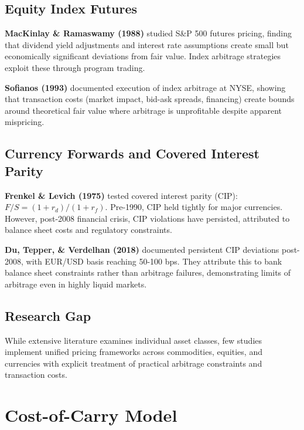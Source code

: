 \documentclass[12pt,a4paper]{article}
\begin{document}
\subsection{Equity Index Futures}

\textbf{MacKinlay \& Ramaswamy (1988)} studied S\&P 500 futures pricing, finding that dividend yield adjustments and interest rate assumptions create small but economically significant deviations from fair value. Index arbitrage strategies exploit these through program trading.

\textbf{Sofianos (1993)} documented execution of index arbitrage at NYSE, showing that transaction costs (market impact, bid-ask spreads, financing) create bounds around theoretical fair value where arbitrage is unprofitable despite apparent mispricing.

\subsection{Currency Forwards and Covered Interest Parity}

\textbf{Frenkel \& Levich (1975)} tested covered interest parity (CIP): $F/S = (1 + r_d)/(1 + r_f)$. Pre-1990, CIP held tightly for major currencies. However, post-2008 financial crisis, CIP violations have persisted, attributed to balance sheet costs and regulatory constraints.

\textbf{Du, Tepper, \& Verdelhan (2018)} documented persistent CIP deviations post-2008, with EUR/USD basis reaching 50-100 bps. They attribute this to bank balance sheet constraints rather than arbitrage failures, demonstrating limits of arbitrage even in highly liquid markets.

\subsection{Research Gap}

While extensive literature examines individual asset classes, few studies implement unified pricing frameworks across commodities, equities, and currencies with explicit treatment of practical arbitrage constraints and transaction costs.

\newpage
\section{Cost-of-Carry Model}
\end{document}
